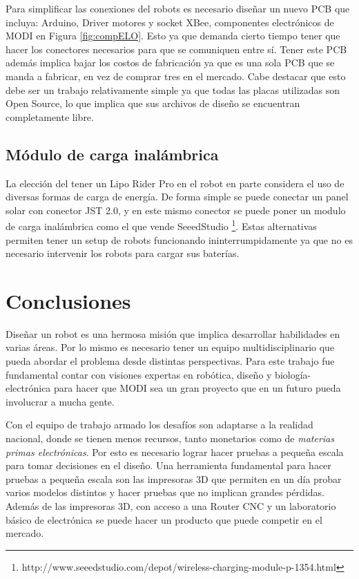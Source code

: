Para simplificar las conexiones del robots es necesario diseñar un nuevo PCB que incluya: Arduino, Driver motores y socket XBee, componentes electrónicos de MODI en Figura \ref{fig:compELO}. Esto ya que demanda cierto tiempo tener que hacer los conectores necesarios para que se comuniquen entre sí. Tener este PCB además implica bajar los costos de fabricación ya que es una sola PCB que se manda a fabricar, en vez de comprar tres en el mercado. Cabe destacar que esto debe ser un trabajo relativamente simple ya que todas las placas utilizadas son Open Source, lo que implica que sus archivos de diseño se encuentran completamente libre.



\subsection{Módulo de carga inalámbrica}
La elección del tener un Lipo Rider Pro en el robot en parte considera el uso de diversas formas de carga de energía. De forma simple se puede conectar un panel solar con conector JST 2.0, y en este mismo conector se puede poner un modulo de carga inalámbrica como el que vende SeeedStudio \footnote{http://www.seeedstudio.com/depot/wireless-charging-module-p-1354.html}. Estas alternativas permiten tener un setup de robots funcionando ininterrumpidamente ya que no es necesario intervenir los robots para cargar sus baterías. 



\section{Conclusiones}
Diseñar un robot es una hermosa misión que implica desarrollar habilidades en varias áreas. Por lo mismo es necesario tener un equipo multidisciplinario que pueda abordar el problema desde distintas perspectivas. Para este trabajo fue fundamental contar con visiones expertas en robótica, diseño y biología-electrónica para hacer que MODI sea un gran proyecto que en un futuro pueda involucrar a mucha gente.

Con el equipo de trabajo armado los desafíos son adaptarse a la realidad nacional, donde se tienen menos recursos, tanto monetarios como de \textit{materias primas electrónicas}. Por esto es necesario lograr  hacer pruebas a pequeña escala para tomar decisiones en el diseño. Una herramienta fundamental para hacer pruebas a pequeña escala son las impresoras 3D que permiten en un día probar varios modelos distintos y hacer pruebas que no implican grandes pérdidas. Además de las impresoras 3D, con acceso a una Router CNC y un laboratorio básico de electrónica se puede hacer un producto que puede competir en el mercado.

